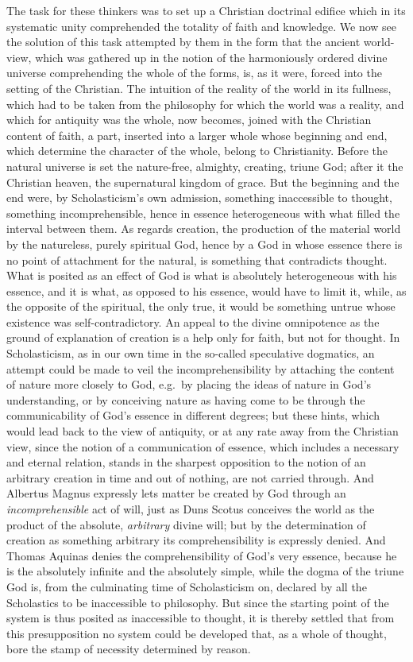 The task for these thinkers was to set up a Christian doctrinal edifice which in its systematic unity comprehended the totality of faith and knowledge. We now see the solution of this task attempted by them in the form that the ancient world-view, which was gathered up in the notion of the harmoniously ordered divine universe comprehending the whole of the forms, is, as it were, forced into the setting of the Christian. The intuition of the reality of the world in its fullness, which had to be taken from the philosophy for which the world was a reality, and which for antiquity was the whole, now becomes, joined with the Christian content of faith, a part, inserted into a larger whole whose beginning and end, which determine the character of the whole, belong to Christianity. Before the natural universe is set the nature-free, almighty, creating, triune God; after it the Christian heaven, the supernatural kingdom of grace. But the beginning and the end were, by Scholasticism's own admission, something inaccessible to thought, something incomprehensible, hence in essence heterogeneous with what filled the interval between them. As regards creation, the production of the material world by the natureless, purely spiritual God, hence by a God in whose essence there is no point of attachment for the natural, is something that contradicts thought. What is posited as an effect of God is what is absolutely heterogeneous with his essence, and it is what, as opposed to his essence, would have to limit it, while, as the opposite of the spiritual, the only true, it would be something untrue whose existence was self-contradictory. An appeal to the divine omnipotence as the ground of explanation of creation is a help only for faith, but not for thought. In Scholasticism, as in our own time in the so-called speculative dogmatics, an attempt could be made to veil the incomprehensibility by attaching the content of nature more closely to God, e.g.\ by placing the ideas of nature in God's understanding, or by conceiving nature as having come to be through the communicability of God's essence in different degrees; but these hints, which would lead back to the view of antiquity, or at any rate away from the Christian view, since the notion of a communication of essence, which includes a necessary and eternal relation, stands in the sharpest opposition to the notion of an arbitrary creation in time and out of nothing, are not carried through. And Albertus Magnus expressly lets matter be created by God through an \emph{incomprehensible} act of will, just as Duns Scotus conceives the world as the product of the absolute, \emph{arbitrary} divine will; but by the determination of creation as something arbitrary its comprehensibility is expressly denied. And Thomas Aquinas denies the comprehensibility of God's very essence, because he is the absolutely infinite and the absolutely simple, while the dogma of the triune God is, from the culminating time of Scholasticism on, declared by all the Scholastics to be inaccessible to philosophy. But since the starting point of the system is thus posited as inaccessible to thought, it is thereby settled that from this presupposition no system could be developed that, as a whole of thought, bore the stamp of necessity determined by reason.

